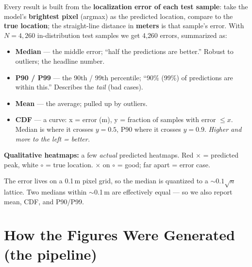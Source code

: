 \documentclass[11pt]{article}
\begin{document}
Every result is built from the \textbf{localization error of each test sample}: take the model's
\textbf{brightest pixel} (argmax) as the predicted location, compare to the \textbf{true location}; the
straight-line distance in \textbf{meters} is that sample's error. With $N=4{,}260$ in-distribution test
samples we get 4{,}260 errors, summarized as:
\begin{itemize}[leftmargin=*,noitemsep]
  \item \textbf{Median} --- the middle error; ``half the predictions are better.'' Robust to outliers; the
        headline number.
  \item \textbf{P90 / P99} --- the 90th / 99th percentile; ``90\% (99\%) of predictions are within this.''
        Describes the \emph{tail} (bad cases).
  \item \textbf{Mean} --- the average; pulled up by outliers.
  \item \textbf{CDF} --- a curve: x = error (m), y = fraction of samples with error $\le x$. Median is
        where it crosses $y{=}0.5$, P90 where it crosses $y{=}0.9$. \emph{Higher and more to the left =
        better.}
\end{itemize}

\textbf{Qualitative heatmaps:} a few \emph{actual} predicted heatmaps. Red $\times$ = predicted peak,
white $\circ$ = true location. $\times$ on $\circ$ = good; far apart = error case.

\begin{measurebox}
The error lives on a 0.1\,m pixel grid, so the median is quantized to a $\sim0.1\sqrt{n}$ lattice. Two
medians within $\sim$0.1\,m are effectively equal --- so we also report mean, CDF, and P90/P99.
\end{measurebox}

\section{How the Figures Were Generated (the pipeline)}
\end{document}
